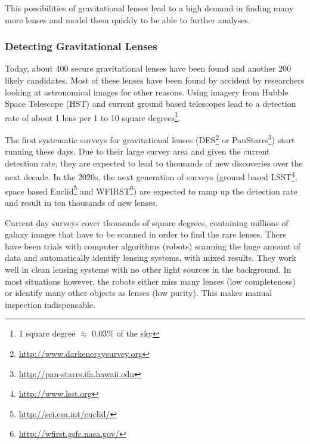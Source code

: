 \documentclass[11pt]{article}
\begin{document}
This possibilities of gravitational lenses lead to a high demand in finding many more lenses and model them quickly to be able to further analyses.



\subsubsection{Detecting Gravitational Lenses}

Today, about 400 secure gravitational lenses have been found and another 200 likely candidates.
Most of these lenses have been found by accident by researchers looking at astronomical images for other reasons.
Using imagery from Hubble Space Telescope (HST) and current ground based telescopes lead to a detection rate of about 1 lens per 1 to 10 square degrees\footnote{1 square degree $\approx$ 0.03\% of the sky}.

The first systematic surveys for gravitational lenses (DES\footnote{\url{http://www.darkenergysurvey.org}} or PanStarrs\footnote{\url{http://pan-starrs.ifa.hawaii.edu}}) start running these days.
Due to their large survey area and given the current detection rate, they are expected to lead to thousands of new discoveries over the next decade.
In the 2020s, the next generation of surveys (ground based LSST\footnote{\url{http://www.lsst.org}}, space based Euclid\footnote{\url{http://sci.esa.int/euclid/}} and WFIRST\footnote{\url{http://wfirst.gsfc.nasa.gov/}}) are expected to ramp up the detection rate and result in ten thousands of new lenses.

Current day surveys cover thousands of square degrees, containing millions of galaxy images that have to be scanned in order to find the rare lenses.
There have been trials with computer algorithms (robots) scanning the huge amount of data and automatically identify lensing systems\cite{robots}, with mixed results.
They work well in clean lensing systems with no other light sources in the background.
In most situations however, the robots either miss many lenses (low completeness) or identify many other objects as lenses (low purity).
This makes manual inspection indispensable.
\end{document}
